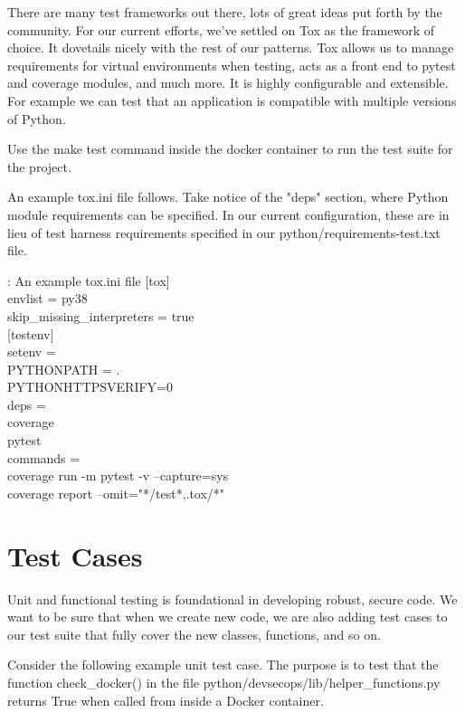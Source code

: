\justify
There are many test frameworks out there, lots of great ideas put forth by the community. For our current
efforts, we've settled on Tox as the framework of choice. It dovetails nicely with the rest of
our patterns. Tox allows us to manage requirements for virtual environments when testing, acts as a front
end to pytest and coverage modules, and much more. It is highly configurable and extensible. For example
we can test that an application is compatible with multiple versions of Python.

\justify
Use the make test command inside the docker container to run the test suite for the project.

\justify
An example tox.ini file follows. Take notice of the "deps" section, where
Python module requirements can be specified. In our current configuration, these are in lieu of test harness requirements specified in our python/requirements-test.txt file.

\begin{mybox}{\thetcbcounter: An example tox.ini file}
  [tox]\\
  envlist = py38\\
  skip\_missing\_interpreters = true\\

  [testenv]\\
  setenv =\\
  PYTHONPATH = .\\
  PYTHONHTTPSVERIFY=0\\
  deps =\\
  coverage\\
  pytest\\
  commands =\\
  coverage run -m pytest -v --capture=sys\\
  coverage report --omit="*/test*,.tox/*"
\end{mybox}

\section{Test Cases}

\justify
Unit and functional testing is foundational in developing robust, secure
code. We want to be sure that when we create new code, we are also adding test cases to our test suite that fully cover the new classes, functions, and so on.


\justify
Consider the following example unit test case. The purpose is to test
that the function check\_docker() in the file python/devsecops/lib/helper\_functions.py returns True when called from inside a Docker container.

